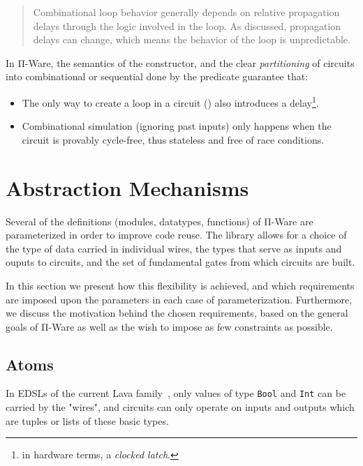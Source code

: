             \begin{quote}
                Combinational loop behavior generally depends on relative propagation delays
                through the logic involved in the loop. As discussed, propagation delays can change,
                which means the behavior of the loop is unpredictable.
            \end{quote}

            In Π-Ware, the semantics of the  constructor, and the clear \emph{partitioning}
            of circuits into combinational or sequential done by the  predicate guarantee that:

            \begin{itemize}
                \item The only way to create a loop in a circuit () also introduces a
                    delay\footnote{in hardware terms, a \emph{clocked latch}.}.

                \item Combinational simulation (ignoring past inputs) only happens when
                    the circuit is provably cycle-free, thus stateless and free of race conditions.
            \end{itemize}


    \section{Abstraction Mechanisms}
    \label{sec:circuit-abstraction}
        Several of the definitions (modules, datatypes, functions) of Π-Ware
        are parameterized in order to improve code reuse.
        The library allows for a choice of the type of data carried in individual wires,
        the types that serve as inputs and ouputs to circuits,
        and the set of fundamental gates from which circuits are built.

        In this section we present how this flexibility is achieved,
        and which requirements are imposed upon the parameters in each case of parameterization.
        Furthermore, we discuss the motivation behind the chosen requirements,
        based on the general goals of Π-Ware as well as the wish to impose as few constraints as possible.


        \subsection{Atoms}
        \label{subsec:atoms}
            In \acp{EDSL} of the current Lava family~\cite{observable-sharing-circuits},
            only values of type \texttt{Bool} and \texttt{Int}
            can be carried by the "wires", and circuits can only operate on inputs and outputs
            which are tuples or lists of these basic types.

